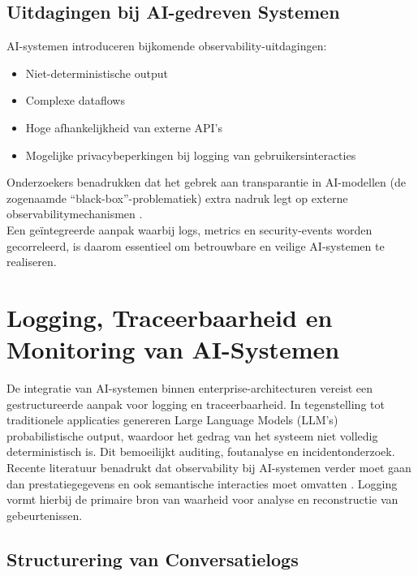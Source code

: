 \subsection{Uitdagingen bij AI-gedreven Systemen}

AI-systemen introduceren bijkomende observability-uitdagingen:

\begin{itemize}
    \item Niet-deterministische output
    \item Complexe dataflows
    \item Hoge afhankelijkheid van externe API’s
    \item Mogelijke privacybeperkingen bij logging van gebruikersinteracties
\end{itemize}

Onderzoekers benadrukken dat het gebrek aan transparantie in AI-modellen (de zogenaamde ``black-box''-problematiek) extra nadruk legt op externe observabilitymechanismen \autocite{bommasani2021opportunities}.\\

Een geïntegreerde aanpak waarbij logs, metrics en security-events worden gecorreleerd, is daarom essentieel om betrouwbare en veilige AI-systemen te realiseren.

\section{Logging, Traceerbaarheid en Monitoring van AI-Systemen}

De integratie van AI-systemen binnen enterprise-architecturen vereist een gestructureerde aanpak voor logging en traceerbaarheid. In tegenstelling tot traditionele applicaties genereren Large Language Models (LLM’s) probabilistische output, waardoor het gedrag van het systeem niet volledig deterministisch is. Dit bemoeilijkt auditing, foutanalyse en incidentonderzoek.\\

Recente literatuur benadrukt dat observability bij AI-systemen verder moet gaan dan prestatiegegevens en ook semantische interacties moet omvatten \autocite{ganesan2022observability}. Logging vormt hierbij de primaire bron van waarheid voor analyse en reconstructie van gebeurtenissen.

\subsection{Structurering van Conversatielogs}

